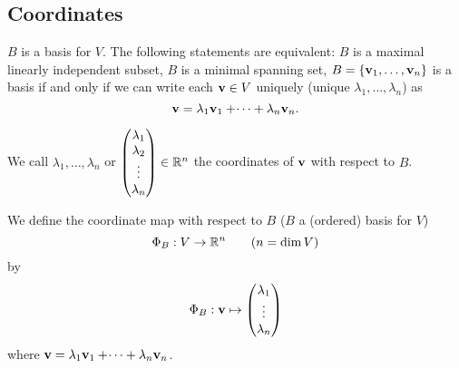 \documentclass[10pt, a4paper]{article}
\begin{document}
\subsection{Coordinates}
$B$ is a basis for $V$.
The following statements are equivalent:
$B$ is a maximal linearly independent subset,
$B$ is a minimal spanning set,
$B = \{\mathbf{v}_1, \dotsc, \mathbf{v}_n\}$ is a basis if and only if we can write each $\mathbf{v} \in V$ uniquely
(unique $\lambda_1, \dotsc, \lambda_n$)
as
\[
\mathbf{v} = \lambda_1\mathbf{v}_1 + \dotsi + \lambda_n\mathbf{v}_n.
\]

We call $\lambda_1, \dotsc, \lambda_n$ or
$
\begin{pmatrix}
    \lambda_1 \\ \lambda_2 \\ \vdots \\ \lambda_n
\end{pmatrix} \in \mathbb{R} ^ n
$
the coordinates of $\mathbf{v}$ with respect to $B$.

\begin{definition}
    We define the coordinate map with respect to $B$
    ($B$ a 
    (ordered)
    basis for $V$)
    \[
    \Phi_B : V \rightarrow \mathbb{R} ^ n\qquad\text{($n = \dim{V}$)}
    \]
    by
    \[
    \Phi_B : \mathbf{v} \mapsto \begin{pmatrix}
        \lambda_1 \\ \vdots \\ \lambda_n
    \end{pmatrix}
    \]
    where $\mathbf{v} = \lambda_1\mathbf{v}_1 + \dotsi + \lambda_n\mathbf{v}_n$.
\end{definition}
\end{document}
